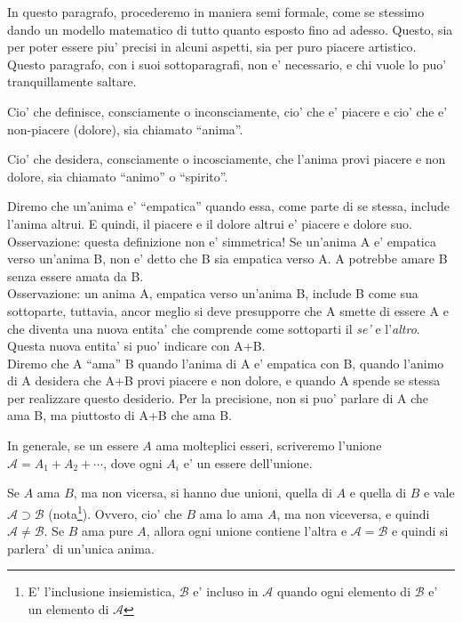 In questo paragrafo, procederemo in maniera semi formale, come se stessimo dando un modello matematico di tutto quanto esposto fino ad adesso. Questo, sia per poter essere piu' precisi in alcuni aspetti, sia per puro piacere artistico. Questo paragrafo, con i suoi sottoparagrafi, non e' necessario, e chi vuole lo puo' tranquillamente saltare.

Cio' che definisce, consciamente o inconsciamente, cio' che e' piacere e cio' che e' non-piacere (dolore), sia chiamato ``anima''.

Cio' che desidera, consciamente o incosciamente, che l'anima provi piacere e non dolore, sia chiamato ``animo'' o ``spirito''.

Diremo che un'anima e' ``empatica'' quando essa, come parte di se stessa, include l'anima altrui. E quindi, il piacere e il dolore altrui e' piacere e dolore suo. \\
Osservazione: questa definizione non e' simmetrica! Se un'anima A e' empatica verso un'anima B, non e' detto che B sia empatica verso A. A potrebbe amare B senza essere amata da B. \\
Osservazione: un anima A, empatica verso un'anima B, include B come sua sottoparte, tuttavia, ancor meglio si deve presupporre che A smette di essere A e che diventa una nuova entita' che comprende come sottoparti il \emph{se'} e l'\emph{altro}. Questa nuova entita' si puo' indicare con A+B. \\

Diremo che A ``ama'' B quando l'anima di A e' empatica con B, quando l'animo di A desidera che A+B provi piacere e non dolore, e quando A spende se stessa per realizzare questo desiderio. Per la precisione, non si puo' parlare di A che ama B, ma piuttosto di A+B che ama B. 

In generale, se un essere $A$ ama molteplici esseri, scriveremo l'unione $\mathcal{A}=A_1+A_2+\cdots$, dove ogni $A_i$ e' un essere dell'unione.

\def\self{\textrm{self}}
\def\other{\textrm{other}}

Se $A$ ama $B$, ma non vicersa, si hanno due unioni, quella di $A$ e quella di $B$ e vale $\mathcal{A} \supset \mathcal{B}$ (nota\footnote{E' l'inclusione insiemistica, $\mathcal{B}$ e' incluso in $\mathcal{A}$ quando ogni elemento di $\mathcal{B}$ e' un elemento di $\mathcal{A}$}).  Ovvero, cio' che $B$ ama lo ama $A$, ma non viceversa, e quindi $\mathcal{A} \neq \mathcal{B}$. Se $B$ ama pure $A$, allora ogni unione contiene l'altra e $\mathcal{A} = \mathcal{B}$ e quindi si parlera' di un'unica anima. 

